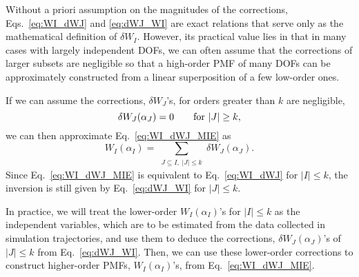 \documentclass[reprint, superscriptaddress]{revtex4-1}
\begin{document}
Without a priori assumption on the magnitudes of the corrections,
Eqs.~\eqref{eq:WI_dWJ} and \eqref{eq:dWJ_WI} are exact relations
that serve only as the mathematical definition of $\delta W_I$.
%
However, its practical value lies in that in many cases
with largely independent DOFs,
we can often assume
that the corrections of larger subsets are negligible
so that a high-order PMF of many DOFs can be approximately constructed
from a linear superposition of a few low-order ones.


If we can assume the corrections, $\delta W_J$'s,
for orders greater than $k$ are negligible,
%
\begin{equation}
  \delta W_J(\alpha_J) = 0
  \qquad
  \mbox{for $|J| \ge k$}
  ,
  \notag
\end{equation}
%
we can then approximate Eq.~\eqref{eq:WI_dWJ_MIE} as
%
\begin{equation}
  W_I(\alpha_I)
  =
  \sum_{ \substack{J \subseteq I, \; |J| \le k} }
  \!\! \delta W_J(\alpha_J)
  .
  \label{eq:WI_dWJ_MIE}
\end{equation}
%
Since Eq.~\eqref{eq:WI_dWJ_MIE}
is equivalent to Eq.~\eqref{eq:WI_dWJ}
for $|I| \le k$,
the inversion is still given by Eq.~\eqref{eq:dWJ_WI} for $|J| \le k$.

In practice, we will treat the lower-order $W_I(\alpha_I)$'s
for $|I| \le k$ as the independent variables,
which are to be estimated from the data collected in simulation trajectories,
%
and use them to deduce the corrections,
$\delta W_J(\alpha_J)$'s of $|J| \le k$ from Eq.~\eqref{eq:dWJ_WI}.
%
Then, we can use these lower-order corrections
to construct higher-order PMFs, $W_I(\alpha_I)$'s,
from Eq.~\eqref{eq:WI_dWJ_MIE}.
\end{document}
